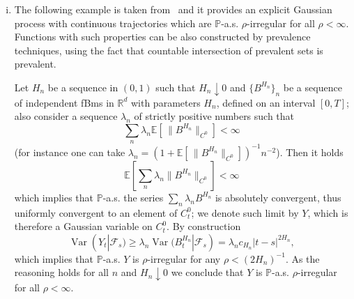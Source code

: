 \documentclass[10pt]{article}
\newcommand{\mathd}{\mathrm{d}}
\newcommand{\nobracket}{}
\newcommand{\tmop}[1]{\ensuremath{\operatorname{#1}}}
\newenvironment{enumerateroman}{\begin{enumerate}[i.] }{\end{enumerate}}
\begin{document}
\begin{enumerateroman}
    \begin{align*}
      Y_t = \int_0^t B^H_r \mathd r & = \, \left[ \int_0^s B^H_r \mathd r +
      \int_s^t \mathbb{E} [B^H_r | \mathcal{F}_s \nobracket] \mathd r \right]
      + \int_s^t (B^H_r \nobracket -\mathbb{E} [B^H_r | \mathcal{F}_s]) \mathd
      r\\
      & = \, Y^{(1)}_{s, t} + c_H \int_s^t \int_s^r (r - u)^{H - 1 / 2}
      \mathd B_u \mathd r\\
      & = \, Y^{(1)}_{s, t} + \tilde{c}_H \int_s^t (t - u)^{(H + 1) - 1 / 2}
      \mathd B_u = Y^{(1)}_{s, t} + Y^{(2)}_{s, t} .
    \end{align*}
    
    In particular, since $B^H$ as $C^{H - \varepsilon}$ trajectories, $Y$ has
    $C^{1 + H - \varepsilon}$ trajectories, showing that it is still possible
    for differentiable paths to be $\rho$\mbox{-}irregular, for relatively
    small parameters $\rho$. The reasoning can be iterated: if $Y$ is the
    process obtained by integrating $n$ times $B^H$, so that $Y \in C^{n + H
    -}$ with full probability, then it has a decomposition such that
    \[ Y_t = Y^{(1)}_{s, t} + Y^{(2)}_{s, t}, \quad Y^{(2)}_{s, t} = c_{n, H}
       \int_s^t (t - u)^{(H + n) - 1 / 2} \mathd B_u \]
    which implies that it is $(n + H)$\mbox{-}SLND; moreover for any $k \in \{
    0, \ldots, n \}$, $D^k Y$ is $(H + n - k)$\mbox{-}SLND.
    
    \item The following example is taken from~{\cite{banosproske}} and it
    provides an explicit Gaussian process with continuous trajectories which
    are $\mathbb{P}$-a.s. $\rho$-irregular for all $\rho < \infty$. Functions
    with such properties can be also constructed by prevalence techniques,
    using the fact that countable intersection of prevalent sets is prevalent.
    
    Let $H_n$ be a sequence in $(0, 1)$ such that $H_n \downarrow 0$ and $\{
    B^{H_n} \}_n$ be a sequence of independent fBms in $\mathbb{R}^d$ with
    parameters $H_n$, defined on an interval $[0, T]$; also consider a
    sequence $\lambda_n$ of strictly positive numbers such that
    \[ \sum_n \lambda_n \mathbb{E} \left[ \, \| B^{H_n} \|_{C^0}  \right] <
       \infty \]
    (for instance one can take $\lambda_n = \left( 1 +\mathbb{E} \left[ \, \|
    B^{H_n} \|_{C^0}  \right] \right)^{- 1} n^{- 2}$). Then it holds
    \[ \mathbb{E} \left[ \sum_n \lambda_n  \| B^{H_n} \|_{C^0} \right] <
       \infty \]
    which implies that $\mathbb{P}$-a.s. the series $\sum_n \lambda_n B^{H_n}$
    is absolutely convergent, thus uniformly convergent to an element of
    $C^0_t$; we denote such limit by $Y$, which is therefore a Gaussian
    variable on $C^0_t$. By construction
    \[ \tmop{Var} (Y_t | \mathcal{F}_s \nobracket) \geqslant \lambda_n
       \tmop{Var} (B^{H_n}_t | \mathcal{F}_s \nobracket) = \lambda_n c_{H_n} |
       t - s |^{2 H_n}, \]
    which implies that $\mathbb{P}$-a.s. $Y$ is $\rho$-irregular for any $\rho
    < (2 H_n)^{- 1}$. As the reasoning holds for all $n$ and $H_n \downarrow
    0$ we conclude that $Y$ is $\mathbb{P}$\mbox{-}a.s.
    $\rho$\mbox{-}irregular for all $\rho < \infty$.
  \end{enumerateroman}
\end{document}
